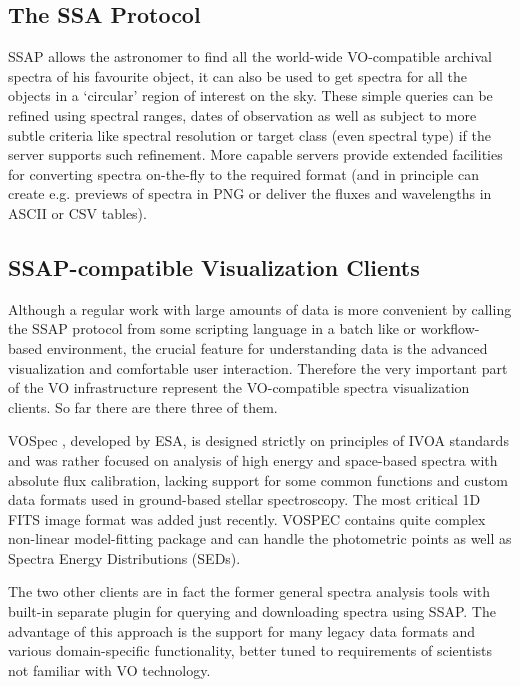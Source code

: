 \documentclass[final,authoryear,5p,times,twocolumn]{elsarticle}
\begin{document}
\subsection{The SSA Protocol}
%
SSAP allows the astronomer to find all the world-wide VO-compatible archival
spectra of his favourite object, it can also be used to get spectra for all
the objects in a `circular' region of interest on the sky. These simple
queries can be refined using spectral ranges, dates of observation as well as
subject to more subtle criteria like spectral resolution or target class (even
spectral type) if the server supports such refinement. More capable servers
provide extended facilities for converting spectra on-the-fly to the required
format (and in principle can create e.g. previews of spectra in PNG or deliver
the fluxes and wavelengths in ASCII or CSV tables).

\subsection{SSAP-compatible  Visualization Clients}
%
Although a regular work with large amounts of data is more convenient by
calling the SSAP protocol from some scripting language in a batch like or
workflow-based environment, the crucial feature for understanding data is the
advanced visualization and comfortable user interaction.  Therefore the very
important part of the VO infrastructure represent the VO-compatible spectra
visualization clients.  So far there are there three of them. 

VOSpec \citep[][]{2005ASPC..347..198O}, developed by ESA, is
designed strictly on principles of IVOA standards and was rather focused on
analysis of high energy and space-based spectra with absolute flux
calibration, lacking support for some common functions and custom data formats
used in ground-based stellar spectroscopy. The most critical 1D FITS image
format was added just recently. VOSPEC contains quite complex non-linear
model-fitting package and can handle the photometric points as well as Spectra
Energy Distributions (SEDs).  

The two other clients are in fact the former general spectra analysis tools
with built-in separate plugin for querying and downloading spectra using SSAP.
The advantage of this approach is the support for many legacy data formats and
various domain-specific functionality, better tuned to requirements of
scientists not familiar with VO technology.
\end{document}
